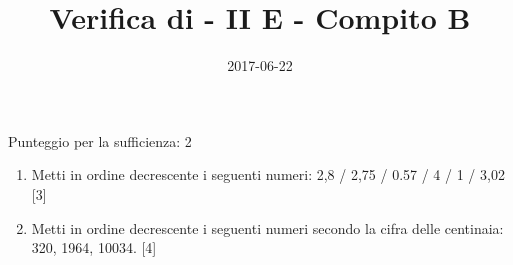 \documentclass[11pt,fleqn]{article} %
\title{Verifica di  - II E - Compito B}
\date{2017-06-22}
\begin{document}
\maketitle
Punteggio per la sufficienza: 2
\begin{enumerate}

	\item Metti in ordine decrescente i seguenti numeri: 2,8 / 2,75 / 0.57 / 4 / 1 / 3,02 [3] 
\item Metti in ordine decrescente i seguenti numeri secondo la cifra delle centinaia: 320, 1964, 10034.  [4] 
\end{enumerate}
\end{document}
